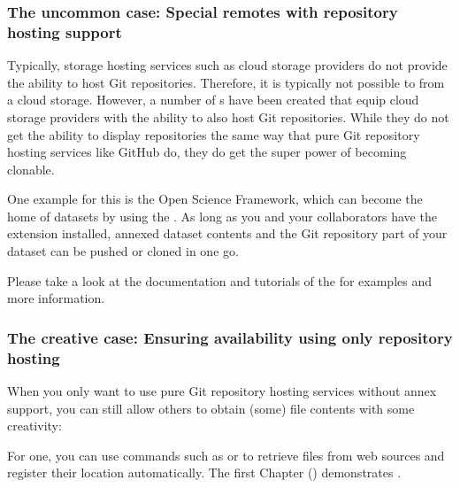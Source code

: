 \subsubsection{The uncommon case: Special remotes with repository hosting support}
\label{\detokenize{basics/101-138-sharethirdparty:the-uncommon-case-special-remotes-with-repository-hosting-support}}
\sphinxAtStartPar
Typically, storage hosting services such as cloud storage providers do not provide
the ability to host Git repositories.
Therefore, it is typically not possible to  from a cloud storage.
However, a number of {\hyperref[\detokenize{glossary:term-DataLad-extension}]{}}s have been created that equip cloud storage providers with the ability to also host Git repositories.
While they do not get the ability to display repositories the same way that pure
Git repository hosting services like GitHub do, they do get the super power of becoming clonable.

\sphinxAtStartPar
One example for this is the Open Science Framework, which can become the home of datasets by using the .
As long as you and your collaborators have the extension installed, annexed dataset
contents and the Git repository part of your dataset can be pushed or cloned in one go.

\begin{figure}[tbp]
\centering

\noindent{}
\end{figure}

\sphinxAtStartPar
Please take a look at the documentation and tutorials of the  for examples and more information.


\subsubsection{The creative case: Ensuring availability using only repository hosting}
\label{\detokenize{basics/101-138-sharethirdparty:the-creative-case-ensuring-availability-using-only-repository-hosting}}
\sphinxAtStartPar
When you only want to use pure Git repository hosting services without annex support, you can still allow others to obtain (some) file contents with some creativity:

\sphinxAtStartPar
For one, you can use commands such as  or   to retrieve files from web sources and register their location automatically.
The first Chapter {\hyperref[\detokenize{basics/basics-datasets:chapter-datasets}]{}} () demonstrates .

